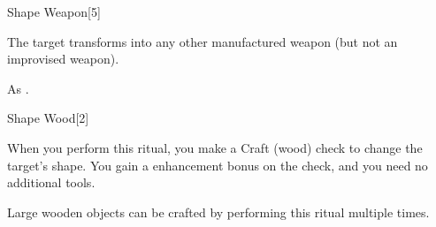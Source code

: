 \begin{spellsection}[Greater]{Shape Weapon}[5]
    \begin{spellheader}
    \end{spellheader}
    \begin{spellcontent}
        \begin{spelltargetinginfo}
        \end{spelltargetinginfo}
        \begin{spelleffects}

            \spelleffect The target transforms into any other manufactured weapon (but not an improvised weapon).
        \end{spelleffects}
    \end{spellcontent}
    \begin{spellfooter}
        \spellnotes As .
    \end{spellfooter}
\end{spellsection}

\begin{spellsection}{Shape Wood}[2]
    \begin{spellheader}
    \end{spellheader}
    \begin{spellcontent}
        \begin{spelltargetinginfo}
        \end{spelltargetinginfo}
        \begin{spelleffects}

            \spelleffect When you perform this ritual, you make a Craft (wood) check to change the target's shape. You gain a  enhancement bonus on the check, and you need no additional tools.
        \end{spelleffects}
    \end{spellcontent}
    \begin{spellfooter}
        \spellnotes Large wooden objects can be crafted by performing this ritual multiple times.
    \end{spellfooter}
\end{spellsection}

